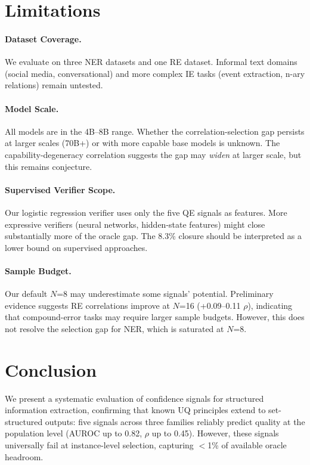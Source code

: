 \documentclass[11pt,a4paper]{article}
\begin{document}
\section{Limitations}

\paragraph{Dataset Coverage.}
We evaluate on three NER datasets and one RE dataset.
Informal text domains (social media, conversational) and more complex IE tasks (event extraction, n-ary relations) remain untested.

\paragraph{Model Scale.}
All models are in the 4B--8B range.
Whether the correlation-selection gap persists at larger scales (70B+) or with more capable base models is unknown.
The capability-degeneracy correlation suggests the gap may \emph{widen} at larger scale, but this remains conjecture.

\paragraph{Supervised Verifier Scope.}
Our logistic regression verifier uses only the five QE signals as features.
More expressive verifiers (neural networks, hidden-state features) might close substantially more of the oracle gap.
The 8.3\% closure should be interpreted as a lower bound on supervised approaches.

\paragraph{Sample Budget.}
Our default $N$=8 may underestimate some signals' potential.
Preliminary evidence suggests RE correlations improve at $N$=16 (+0.09--0.11 $\rho$), indicating that compound-error tasks may require larger sample budgets.
However, this does not resolve the selection gap for NER, which is saturated at $N$=8.

\section{Conclusion}

We present a systematic evaluation of confidence signals for structured information extraction, confirming that known UQ principles extend to set-structured outputs: five signals across three families reliably predict quality at the population level (AUROC up to 0.82, $\rho$ up to 0.45).
However, these signals universally fail at instance-level selection, capturing $<$1\% of available oracle headroom.
\end{document}
